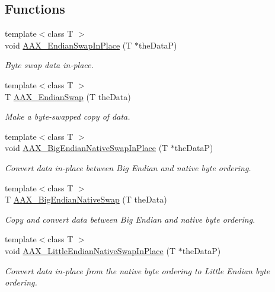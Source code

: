 \subsection*{Functions}
\begin{DoxyCompactItemize}
\item 
{\footnotesize template$<$class T $>$ }\\void \hyperlink{a00205_a121ee6a20eb996039b0f187db0a2cc8e}{A\+A\+X\+\_\+\+Endian\+Swap\+In\+Place} (T $\ast$the\+Data\+P)
\begin{DoxyCompactList}\small\item\em Byte swap data in-\/place. \end{DoxyCompactList}\item 
{\footnotesize template$<$class T $>$ }\\T \hyperlink{a00205_a5caa5e68dec3f028697b64ad04f0cb5c}{A\+A\+X\+\_\+\+Endian\+Swap} (T the\+Data)
\begin{DoxyCompactList}\small\item\em Make a byte-\/swapped copy of data. \end{DoxyCompactList}\item 
{\footnotesize template$<$class T $>$ }\\void \hyperlink{a00205_a2aa4dc892c77aa0ed29e84a5f29c9538}{A\+A\+X\+\_\+\+Big\+Endian\+Native\+Swap\+In\+Place} (T $\ast$the\+Data\+P)
\begin{DoxyCompactList}\small\item\em Convert data in-\/place between Big Endian and native byte ordering. \end{DoxyCompactList}\item 
{\footnotesize template$<$class T $>$ }\\T \hyperlink{a00205_a7387790d73eed6c54af682c7afd9e463}{A\+A\+X\+\_\+\+Big\+Endian\+Native\+Swap} (T the\+Data)
\begin{DoxyCompactList}\small\item\em Copy and convert data between Big Endian and native byte ordering. \end{DoxyCompactList}\item 
{\footnotesize template$<$class T $>$ }\\void \hyperlink{a00205_af4164bdfb3807edcd582e0289a6ed59a}{A\+A\+X\+\_\+\+Little\+Endian\+Native\+Swap\+In\+Place} (T $\ast$the\+Data\+P)
\begin{DoxyCompactList}\small\item\em Convert data in-\/place from the native byte ordering to Little Endian byte ordering. \end{DoxyCompactList}\item 

\end{DoxyCompactItemize}
